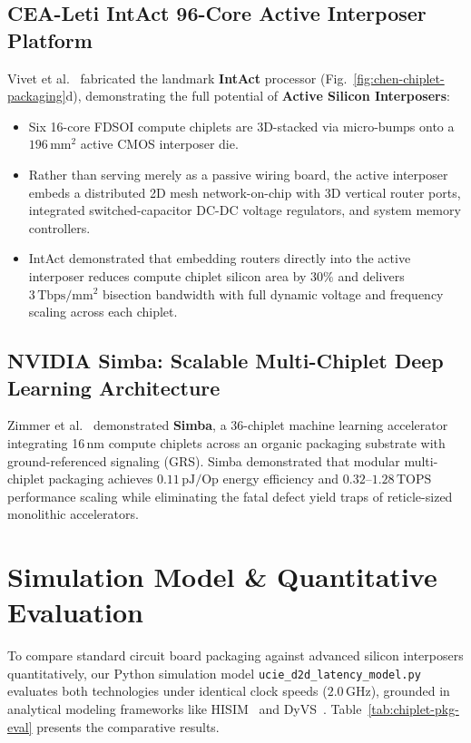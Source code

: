 \subsection{CEA-Leti IntAct 96-Core Active Interposer Platform}
Vivet et al.~\cite{Vivet2021} fabricated the landmark \textbf{IntAct} processor (Fig.~\ref{fig:chen-chiplet-packaging}d), demonstrating the full potential of \textbf{Active Silicon Interposers}:
\begin{itemize}
    \item Six 16-core FDSOI compute chiplets are 3D-stacked via micro-bumps onto a $196\,\mathrm{mm^2}$ active CMOS interposer die.
    \item Rather than serving merely as a passive wiring board, the active interposer embeds a distributed 2D mesh network-on-chip with 3D vertical router ports, integrated switched-capacitor DC-DC voltage regulators, and system memory controllers.
    \item IntAct demonstrated that embedding routers directly into the active interposer reduces compute chiplet silicon area by $30\%$ and delivers $3\,\mathrm{Tbps/mm^2}$ bisection bandwidth with full dynamic voltage and frequency scaling across each chiplet.
\end{itemize}

\subsection{NVIDIA Simba: Scalable Multi-Chiplet Deep Learning Architecture}
Zimmer et al.~\cite{Zimmer2020} demonstrated \textbf{Simba}, a 36-chiplet machine learning accelerator integrating 16\,nm compute chiplets across an organic packaging substrate with ground-referenced signaling (GRS). Simba demonstrated that modular multi-chiplet packaging achieves $0.11\,\mathrm{pJ/Op}$ energy efficiency and $0.32\text{--}1.28\,\mathrm{TOPS}$ performance scaling while eliminating the fatal defect yield traps of reticle-sized monolithic accelerators.

\section{Simulation Model \& Quantitative Evaluation}
\label{sec:chiplet-sim-results}

To compare standard circuit board packaging against advanced silicon interposers quantitatively, our Python simulation model \texttt{ucie\_d2d\_latency\_model.py} evaluates both technologies under identical clock speeds ($2.0\,\mathrm{GHz}$), grounded in analytical modeling frameworks like HISIM~\cite{Wang2025HiSim} and DyVS~\cite{Wu2026DyVS}. Table~\ref{tab:chiplet-pkg-eval} presents the comparative results.

